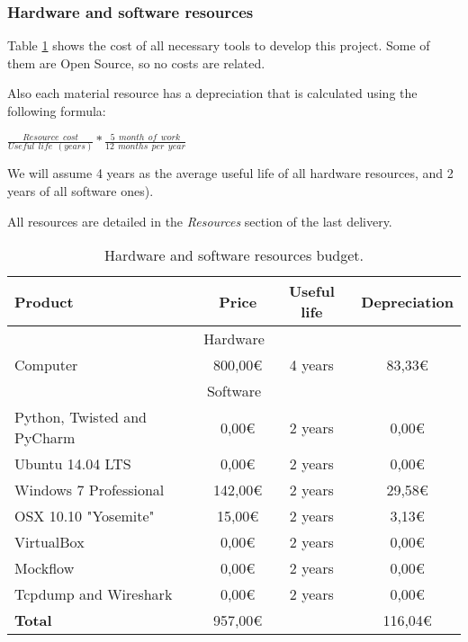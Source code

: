 \subsubsection{Hardware and software resources}
Table \ref{tab:hardsoft} shows the cost of all necessary tools to develop this project. Some of them are Open Source, so no costs are related.

Also each material resource has a depreciation that is calculated using the following formula:
\vspace{25pt}
\\ \centerline{ \LARGE $ \frac{Resource\ \ cost}{Useful\ \ life\ \ (years)} * \frac{5\ \ month\ \ of\ \ work}{12\ \ months\ \ per\ \ year} $ } 
\vspace{10pt}

We will assume 4 years as the average useful life of all hardware resources, and 2 years of all software ones).

All resources are detailed in the \textit{Resources} section of the last delivery.

\begin{table}[!htb]
\centering
  \begin{tabular}{| l | c | c | c |}
  \hline  Product & Price & Useful life & Depreciation \\ \hline 
  \multicolumn{4}{|c|}{ Hardware} \\ \hline
  Computer & 800,00€ & 4 years & 83,33€        \\ \hline 
  \multicolumn{4}{|c|}{  Software} \\ \hline
  Python, Twisted and PyCharm & 0,00€ & 2 years & 0,00€        \\ \hline
  Ubuntu 14.04 LTS & 0,00€ & 2 years & 0,00€        \\ \hline
  Windows 7 Professional & 142,00€ & 2 years & 29,58€        \\ \hline
  OSX 10.10 "Yosemite" & 15,00€ & 2 years & 3,13€        \\ \hline
  VirtualBox & 0,00€ & 2 years & 0,00€        \\ \hline
  Mockflow & 0,00€ & 2 years & 0,00€        \\ \hline
  Tcpdump and Wireshark & 0,00€ & 2 years & 0,00€        \\ \hline  \hline 
  \textbf{Total} & 957,00€ &  & 116,04€  \\ \hline 
  \end{tabular}
  \caption{Hardware and software resources budget.} \vspace{3pt}
  \label{tab:hardsoft}
\end{table}